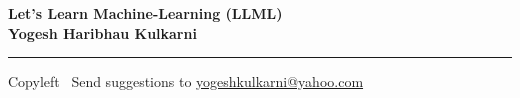 
\graphicspath{{images/}}

\footnotesize


\begin{center}
\Large{\textbf{Let's Learn Machine-Learning (LLML)\\ Yogesh Haribhau Kulkarni}}  
\end{center}

\begin{multicols}{2}

\end{multicols}

\rule{\linewidth}{0.25pt}
\scriptsize
Copyleft \textcopyleft\  Send suggestions to 
\href{http://www.yogeshkulkarni.com}{yogeshkulkarni@yahoo.com}


